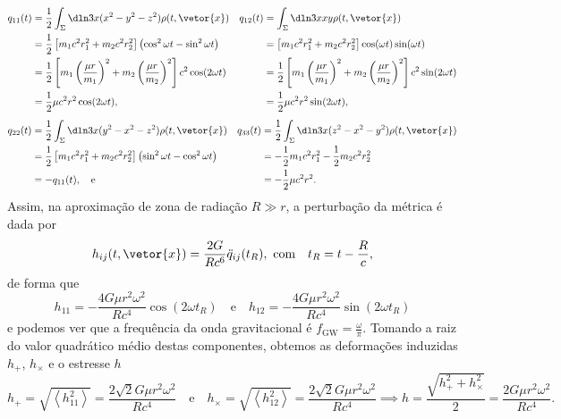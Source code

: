 \begin{align*}
    q_{11}(t) &= \frac12 \int_{\Sigma}\dln3x (x^2 - y^2 - z^2) \rho(t, \vetor{x})&
    q_{12}(t) &= \int_{\Sigma}\dln3x xy \rho(t, \vetor{x})\\
              &= \frac12\left[m_1c^2 r_1^2 + m_2 c^2r_2^2\right] \left(\cos^2\omega t - \sin^2 \omega t\right)&
              &= \left[m_1 c^2 r_1^2 + m_2 c^2 r_2^2\right] \cos(\omega t)\sin(\omega t)\\
              &= \frac12 \left[m_1 \left(\frac{\mu r}{m_1}\right)^2 + m_2\left(\frac{\mu r}{m_2}\right)^2\right] c^2\cos(2\omega t)&
              &= \frac12\left[m_1\left(\frac{\mu r}{m_1}\right)^2 + m_2\left(\frac{\mu r}{m_2}\right)^2\right]c^2\sin(2\omega t)\\
              &= \frac12 \mu c^2 r^2\cos(2\omega t),&
              &= \frac12 \mu c^2 r^2 \sin(2\omega t),
\end{align*}
\begin{align*}
    q_{22}(t) &= \frac12 \int_{\Sigma}\dln3x (y^2 - x^2 - z^2) \rho(t, \vetor{x})&
    q_{33}(t) &= \frac12 \int_{\Sigma}\dln3x (z^2 - x^2 - y^2) \rho(t, \vetor{x})\\
              &= \frac12\left[m_1c^2 r_1^2 + m_2 c^2r_2^2\right] \left(\sin^2\omega t - \cos^2 \omega t\right)&
              &= -\frac12 m_1c^2r_1^2  - \frac12 m_2c^2r_2^2\\
              &= - q_{11}(t),\quad\text{e}&
              &= - \frac12 \mu c^2 r^2.
\end{align*}
Assim, na aproximação de zona de radiação \(R \gg r\), a perturbação da métrica é dada por
\begin{equation*}
    h_{ij}(t, \vetor{x}) = \frac{2G}{Rc^6}\ddot{q}_{ij}(t_R),\text{ com}\quad t_R = t - \frac{R}{c},
\end{equation*}
de forma que
\begin{equation*}
    h_{11} = -\frac{4G\mu r^2\omega^2}{Rc^4}\cos(2\omega t_R)\quad\text{e}\quad h_{12} = -\frac{4G\mu r^2\omega^2}{Rc^4}\sin(2\omega t_R)
\end{equation*}
e podemos ver que a frequência da onda gravitacional é \(f_\mathrm{GW} = \frac{\omega}{\pi}\). Tomando a raiz do valor quadrático médio destas componentes, obtemos as deformações induzidas \(h_+\), \(h_\times\) e o estresse \(h\)
\begin{equation*}
    h_+ = \sqrt{\left\langle h_{11}^2\right\rangle} = \frac{2\sqrt{2}G\mu r^2\omega^2}{Rc^4}\quad\text{e}\quad
    h_\times = \sqrt{\left\langle h_{12}^2\right\rangle} = \frac{2\sqrt{2}G\mu r^2\omega^2}{Rc^4}\implies h = \frac{\sqrt{h_+^2 + h_\times^2}}{2} = \frac{2G\mu r^2 \omega^2}{Rc^4}.
\end{equation*}

